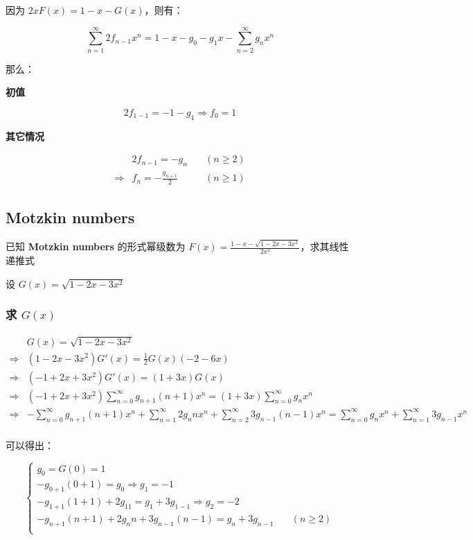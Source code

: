 \documentclass[UTF8]{article}
\begin{document}
因为 $2xF(x)=1-x-G(x)$，则有：

$$
\sum_{n=1}^{\infty}2f_{n-1}x^n=1-x-g_0-g_1x-\sum_{n=2}^{\infty}g_nx^n
$$

那么：

\textbf{初值}

$$
2f_{1-1}=-1-g_1 \Rightarrow f_0=1
$$

\textbf{其它情况}

$$
\begin{aligned}
&2f_{n-1}=-g_n \quad &(n \ge 2) \\
\Rightarrow &f_{n}=-\frac{g_{n+1}}{2} \quad & (n \ge 1)
\end{aligned}
$$

\subsection{Motzkin numbers}

已知 \textbf{Motzkin numbers} 的形式幂级数为 $F(x)=\frac{1-x-\sqrt{1-2x-3x^2}}{2x^2}$，求其线性递推式

设 $G(x)=\sqrt{1-2x-3x^2}$

\subsubsection{求 $G(x)$}

$$
\begin{aligned}
&G(x)=\sqrt{1-2x-3x^2} \\
\Rightarrow &(1-2x-3x^2)G'(x)=\frac{1}{2}G(x)(-2-6x) \\
\Rightarrow &(-1+2x+3x^2)G'(x)=(1+3x)G(x) \\
\Rightarrow &(-1+2x+3x^2)\sum_{n=0}^{\infty}g_{n+1}(n+1)x^n=(1+3x)\sum_{n=0}^{\infty}g_nx^n \\
\Rightarrow &-\sum_{n=0}^{\infty}g_{n+1}(n+1)x^n+\sum_{n=1}^{\infty}2g_{n}nx^n+\sum_{n=2}^{\infty}3g_{n-1}(n-1)x^n=\sum_{n=0}^{\infty}g_nx^n+\sum_{n=1}^{\infty}3g_{n-1}x^n \\
\end{aligned}
$$

可以得出：

$$
\begin{cases}
g_0=G(0)=1 \\
-g_{0+1}(0+1)=g_0 \Rightarrow g_1=-1 \\
-g_{1+1}(1+1)+2g_11=g_1+3g_{1-1} \Rightarrow g_2=-2 \\
-g_{n+1}(n+1)+2g_nn+3g_{n-1}(n-1)=g_{n}+3g_{n-1} \quad & (n \ge 2)\\
\end{cases}
$$
\end{document}
